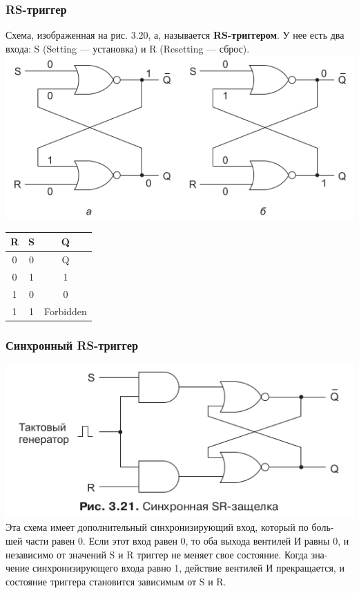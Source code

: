 \documentclass[12pt, a4paper]{article}
\begin{document}
\subsubsection{RS-триггер}
Схема, изображенная на рис. 3.20, а, называется \textbf{RS-триггером}. У нее есть два входа: S (Setting — установка) и R (Resetting — сброс).\\
\includegraphics[scale=0.4]{./images/3_20.png}%
\begin{tabular}{ |c|c|c| } 
 \hline
 R & S & Q \\ 
 \hline
 0 & 0 & Q \\ 
 \hline
 0 & 1 & 1\\ 
 \hline
 1 & 0 & 0 \\
 \hline
 1 & 1 & Forbidden \\
 \hline
\end{tabular}
\subsubsection{Синхронный RS-триггер}
\includegraphics[scale=0.6]{./images/3_21.png}\\
Эта схема имеет дополнительный синхронизирующий вход, который по боль-
шей части равен 0. Если этот вход равен 0, то оба выхода вентилей И равны 0,
и независимо от значений S и R триггер не меняет свое состояние. Когда зна-
чение синхронизирующего входа равно 1, действие вентилей И прекращается,
и состояние триггера становится зависимым от S и R.
\end{document}
